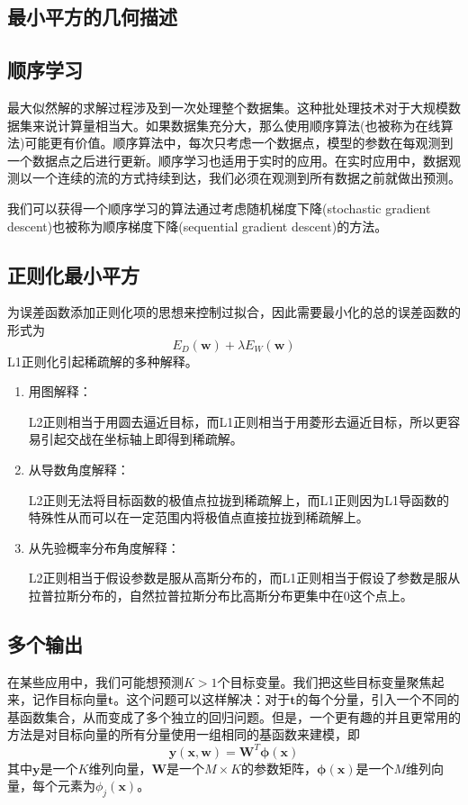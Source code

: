 \subsection*{最小平方的几何描述}
\subsection*{顺序学习}
最大似然解的求解过程涉及到一次处理整个数据集。这种批处理技术对于大规模数据集来说计算量相当大。如果数据集充分大，那么使用顺序算法(也被称为在线算法)可能更有价值。顺序算法中，每次只考虑一个数据点，模型的参数在每观测到一个数据点之后进行更新。顺序学习也适用于实时的应用。在实时应用中，数据观测以一个连续的流的方式持续到达，我们必须在观测到所有数据之前就做出预测。

我们可以获得一个顺序学习的算法通过考虑随机梯度下降(stochastic gradient descent)也被称为顺序梯度下降(sequential gradient descent)的方法。
\subsection*{正则化最小平方}
为误差函数添加正则化项的思想来控制过拟合，因此需要最小化的总的误差函数的形式为
\begin{equation}
	E_D(\boldsymbol{w})+\lambda E_W(\boldsymbol{w})
\end{equation}
L1正则化引起稀疏解的多种解释。
\begin{enumerate}
	\item 用图解释：
	
	L2正则相当于用圆去逼近目标，而L1正则相当于用菱形去逼近目标，所以更容易引起交战在坐标轴上即得到稀疏解。
	
	\item 从导数角度解释：
	
	L2正则无法将目标函数的极值点拉拢到稀疏解上，而L1正则因为L1导函数的特殊性从而可以在一定范围内将极值点直接拉拢到稀疏解上。
	
	\item 从先验概率分布角度解释：
	
	L2正则相当于假设参数是服从高斯分布的，而L1正则相当于假设了参数是服从拉普拉斯分布的，自然拉普拉斯分布比高斯分布更集中在0这个点上。
\end{enumerate}
\subsection*{多个输出}
在某些应用中，我们可能想预测$K>1$个目标变量。我们把这些目标变量聚焦起来，记作目标向量$\boldsymbol{t}$。这个问题可以这样解决：对于$\boldsymbol{t}$的每个分量，引入一个不同的基函数集合，从而变成了多个独立的回归问题。但是，一个更有趣的并且更常用的方法是对目标向量的所有分量使用一组相同的基函数来建模，即
\begin{equation}
	\boldsymbol{y}(\boldsymbol{x},\boldsymbol{w})=\boldsymbol{W}^T\boldsymbol{\phi}(\boldsymbol{x})
\end{equation}
其中$\boldsymbol{y}$是一个$K$维列向量，$\boldsymbol{W}$是一个$M\times K$的参数矩阵，$\boldsymbol{\phi}(\boldsymbol{x})$是一个$M$维列向量，每个元素为$\phi_j(\boldsymbol{x})$。